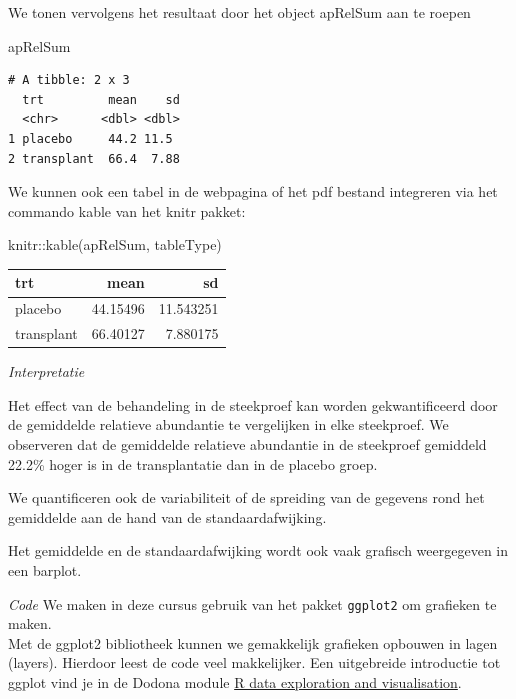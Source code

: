 \documentclass[
  dutch,
  letterpaper,
  12pt]{book}
\newenvironment{Shaded}{\begin{snugshade}}{\end{snugshade}}
\newcommand{\FunctionTok}[1]{\textcolor[rgb]{0.28,0.35,0.67}{#1}}
\newcommand{\NormalTok}[1]{\textcolor[rgb]{0.00,0.23,0.31}{#1}}
\newcommand{\SpecialCharTok}[1]{\textcolor[rgb]{0.37,0.37,0.37}{#1}}
\theoremstyle{definition}
\theoremstyle{definition}
\theoremstyle{definition}
\theoremstyle{remark}
\begin{document}
We tonen vervolgens het resultaat door het object apRelSum aan te roepen

\begin{Shaded}
\begin{Highlighting}[]
\NormalTok{apRelSum}
\end{Highlighting}
\end{Shaded}

\begin{verbatim}
# A tibble: 2 x 3
  trt         mean    sd
  <chr>      <dbl> <dbl>
1 placebo     44.2 11.5 
2 transplant  66.4  7.88
\end{verbatim}

We kunnen ook een tabel in de webpagina of het pdf bestand integreren
via het commando kable van het knitr pakket:

\begin{Shaded}
\begin{Highlighting}[]
\NormalTok{knitr}\SpecialCharTok{::}\FunctionTok{kable}\NormalTok{(apRelSum, tableType)}
\end{Highlighting}
\end{Shaded}

\begin{tabular}{l|r|r}
\hline
trt & mean & sd\\
\hline
placebo & 44.15496 & 11.543251\\
\hline
transplant & 66.40127 & 7.880175\\
\hline
\end{tabular}

\emph{Interpretatie}

Het effect van de behandeling in de steekproef kan worden
gekwantificeerd door de gemiddelde relatieve abundantie te vergelijken
in elke steekproef. We observeren dat de gemiddelde relatieve abundantie
in de steekproef gemiddeld 22.2\% hoger is in de transplantatie dan in
de placebo groep.

We quantificeren ook de variabiliteit of de spreiding van de gegevens
rond het gemiddelde aan de hand van de standaardafwijking.

Het gemiddelde en de standaardafwijking wordt ook vaak grafisch
weergegeven in een barplot.

\emph{Code} We maken in deze cursus gebruik van het pakket
\texttt{ggplot2} om grafieken te maken.\\
Met de ggplot2 bibliotheek kunnen we gemakkelijk grafieken opbouwen in
lagen (layers). Hierdoor leest de code veel makkelijker. Een uitgebreide
introductie tot ggplot vind je in de Dodona module
\href{https://dodona.ugent.be/nl/courses/345/}{R data exploration and
visualisation}.
\end{document}
